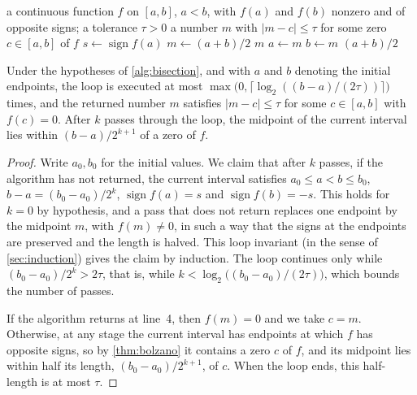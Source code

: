 \begin{algorithm}
\begin{algorithmic}[1]
\Require a continuous function $f$ on $[a,b]$, $a<b$, with $f(a)$ and $f(b)$ nonzero and of opposite signs; a tolerance $\tau>0$
\Ensure a number $m$ with $|m-c|\le\tau$ for some zero $c\in[a,b]$ of $f$
\State $s\gets\operatorname{sign}f(a)$
  \State $m\gets(a+b)/2$
   \Return $m$
  \EndIf
   
    \State $a\gets m$
  \Else
    \State $b\gets m$
  \EndIf
\EndWhile
\State \Return $(a+b)/2$
\end{algorithmic}
\caption{The bisection method. Throughout, $\operatorname{sign}f(a)=s$ and $\operatorname{sign}f(b)=-s$, and every pass through the loop halves the interval $[a,b]$.}
\label{alg:bisection}
\end{algorithm}

\begin{proposition}
\label{prop:bisection}
Under the hypotheses of \cref{alg:bisection}, and with $a$ and $b$ denoting the initial endpoints, the loop is executed at most $\max\bigl(0,\lceil\log_2((b-a)/(2\tau))\rceil\bigr)$ times, and the returned number $m$ satisfies $|m-c|\le\tau$ for some $c\in[a,b]$ with $f(c)=0$. After $k$ passes through the loop, the midpoint of the current interval lies within $(b-a)/2^{k+1}$ of a zero of $f$.
\end{proposition}

\begin{proof}
Write $a_0,b_0$ for the initial values. We claim that after $k$ passes, if the algorithm has not returned, the current interval satisfies $a_0\le a<b\le b_0$, $b-a=(b_0-a_0)/2^k$, $\operatorname{sign}f(a)=s$ and $\operatorname{sign}f(b)=-s$. This holds for $k=0$ by hypothesis, and a pass that does not return replaces one endpoint by the midpoint $m$, with $f(m)\ne0$, in such a way that the signs at the endpoints are preserved and the length is halved. This loop invariant (in the sense of \cref{sec:induction}) gives the claim by induction. The loop continues only while $(b_0-a_0)/2^k>2\tau$, that is, while $k<\log_2\bigl((b_0-a_0)/(2\tau)\bigr)$, which bounds the number of passes.

If the algorithm returns at line~4, then $f(m)=0$ and we take $c=m$. Otherwise, at any stage the current interval has endpoints at which $f$ has opposite signs, so by \cref{thm:bolzano} it contains a zero $c$ of $f$, and its midpoint lies within half its length, $(b_0-a_0)/2^{k+1}$, of $c$. When the loop ends, this half-length is at most $\tau$.
\end{proof}

